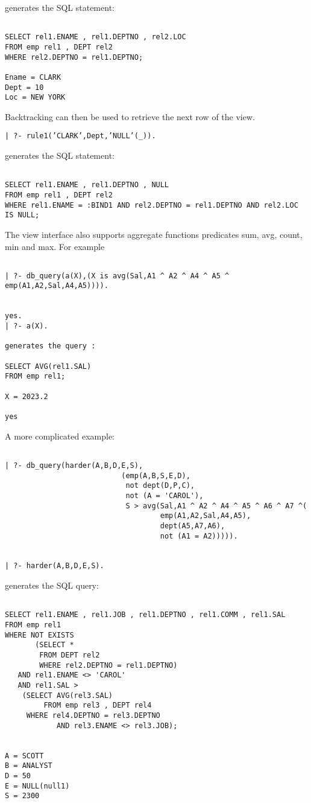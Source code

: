 generates the SQL statement:
\begin{verbatim}

SELECT rel1.ENAME , rel1.DEPTNO , rel2.LOC
FROM emp rel1 , DEPT rel2
WHERE rel2.DEPTNO = rel1.DEPTNO;

Ename = CLARK
Dept = 10
Loc = NEW YORK
\end{verbatim}

Backtracking can then be used to retrieve the next row of the view.
\begin{center}

{\tt | ?- rule1('CLARK',Dept,'NULL'(\_)).}
\end{center}

generates the SQL statement:
\begin{verbatim}

SELECT rel1.ENAME , rel1.DEPTNO , NULL
FROM emp rel1 , DEPT rel2
WHERE rel1.ENAME = :BIND1 AND rel2.DEPTNO = rel1.DEPTNO AND rel2.LOC IS NULL;
\end{verbatim}

The view interface also supports aggregate functions predicates sum, avg,
count, min and max.  For example
\begin{verbatim}

| ?- db_query(a(X),(X is avg(Sal,A1 ^ A2 ^ A4 ^ A5 ^ emp(A1,A2,Sal,A4,A5)))).


yes.
| ?- a(X).

generates the query :

SELECT AVG(rel1.SAL)
FROM emp rel1;

X = 2023.2

yes
\end{verbatim}


A more complicated example:
\begin{verbatim}

| ?- db_query(harder(A,B,D,E,S), 
                           (emp(A,B,S,E,D),
                            not dept(D,P,C), 
                            not (A = 'CAROL'),
                            S > avg(Sal,A1 ^ A2 ^ A4 ^ A5 ^ A6 ^ A7 ^(
                                    emp(A1,A2,Sal,A4,A5),
                                    dept(A5,A7,A6),
                                    not (A1 = A2))))).


| ?- harder(A,B,D,E,S).
\end{verbatim}

generates the SQL query:
\begin{verbatim}

SELECT rel1.ENAME , rel1.JOB , rel1.DEPTNO , rel1.COMM , rel1.SAL
FROM emp rel1
WHERE NOT EXISTS
       (SELECT * 
        FROM DEPT rel2 
        WHERE rel2.DEPTNO = rel1.DEPTNO) 
   AND rel1.ENAME <> 'CAROL' 
   AND rel1.SAL > 
	(SELECT AVG(rel3.SAL) 
         FROM emp rel3 , DEPT rel4
	 WHERE rel4.DEPTNO = rel3.DEPTNO 
            AND rel3.ENAME <> rel3.JOB);


A = SCOTT
B = ANALYST
D = 50
E = NULL(null1)
S = 2300
\end{verbatim}

